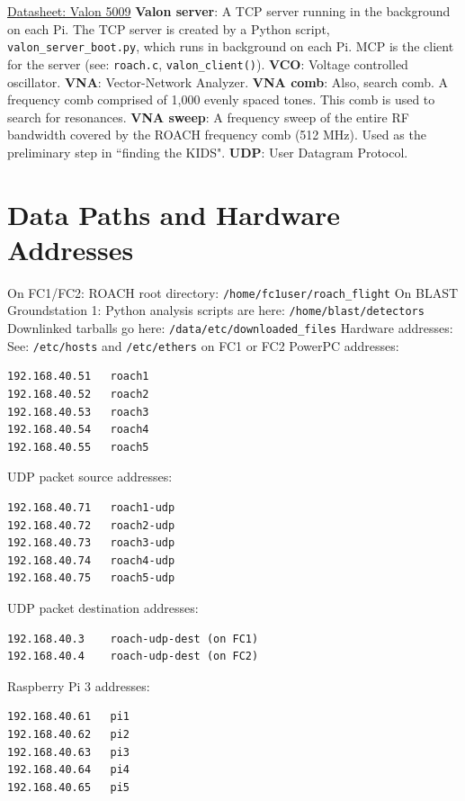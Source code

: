 \href{https://www.valonrf.com/uploads/1/1/7/3/117370920/5009_datasheet_v1.34_20181113_ljr.pdf}{Datasheet: Valon 5009}
\textbf{Valon server}: A TCP server running in the background on each Pi. The TCP server is created by a Python script, \texttt{valon\_server\_boot.py}, which runs in background on each Pi. MCP is the client for the server (see: \texttt{roach.c}, \texttt{valon\_client()}).
\textbf{VCO}: Voltage controlled oscillator.
\textbf{VNA}: Vector-Network Analyzer.
\textbf{VNA comb}: Also, search comb. A frequency comb comprised of 1,000 evenly spaced tones. This comb is used to search for resonances.
\textbf{VNA sweep}: A frequency sweep of the entire RF bandwidth covered by the ROACH frequency comb (512 MHz). Used as the preliminary step in ``finding the KIDS".
\textbf{UDP}: User Datagram Protocol.

\section{Data Paths and Hardware Addresses}\label{data_paths}
On FC1/FC2:
ROACH root directory: \texttt{/home/fc1user/roach\_flight}
On BLAST Groundstation 1:
Python analysis scripts are here: \texttt{/home/blast/detectors}
Downlinked tarballs go here: \texttt{/data/etc/downloaded\_files}
\newline\newline
Hardware addresses:
See: \texttt{/etc/hosts} and \texttt{/etc/ethers} on FC1 or FC2
PowerPC addresses:
\begin{verbatim}
192.168.40.51	roach1
192.168.40.52	roach2
192.168.40.53	roach3
192.168.40.54	roach4
192.168.40.55	roach5
\end{verbatim}

UDP packet source addresses:
\begin{verbatim}
192.168.40.71	roach1-udp
192.168.40.72	roach2-udp
192.168.40.73	roach3-udp
192.168.40.74	roach4-udp
192.168.40.75	roach5-udp
\end{verbatim}

UDP packet destination addresses:
\begin{verbatim}
192.168.40.3	roach-udp-dest (on FC1)
192.168.40.4	roach-udp-dest (on FC2)
\end{verbatim}

Raspberry Pi 3 addresses:
\begin{verbatim}
192.168.40.61	pi1
192.168.40.62	pi2
192.168.40.63	pi3
192.168.40.64	pi4
192.168.40.65	pi5
\end{verbatim}

